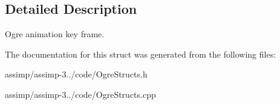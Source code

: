 \subsection{Detailed Description}
Ogre animation key frame. 

The documentation for this struct was generated from the following files\+:\begin{DoxyCompactItemize}
\item 
assimp/assimp-\/3../code/Ogre\+Structs.\+h\item 
assimp/assimp-\/3../code/Ogre\+Structs.\+cpp\end{DoxyCompactItemize}
